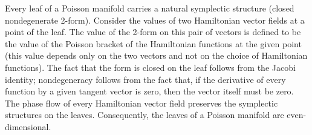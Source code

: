 Every leaf of a Poisson manifold carries a natural symplectic structure (closed nondegenerate 2-form). Consider the values of two Hamiltonian vector fields at a point of the leaf. The value of the 2-form on this pair of vectors is defined to be the value of the Poisson bracket of the Hamiltonian functions at the given point (this value depends only on the two vectors and not on the choice of Hamiltonian functions). The fact that the form is closed on the leaf follows from the Jacobi identity; nondegeneracy follows from the fact that, if the derivative of every function by a given tangent vector is zero, then the vector itself must be zero. The phase flow of every Hamiltonian vector field preserves the symplectic structures on the leaves. Consequently, the leaves of a Poisson manifold are even-dimensional.
